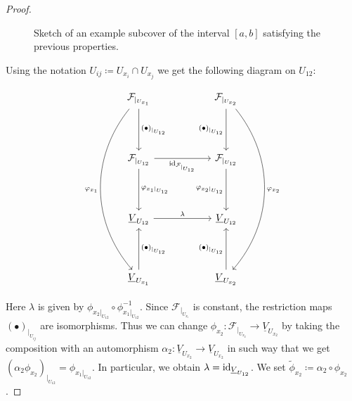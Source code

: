\begin{proof}
\begin{figure}[h!]
    
    \caption{Sketch of an example subcover of the interval $[a,b]$ satisfying the previous properties.}
\end{figure}

     Using the notation $U_{ij} \coloneqq U_{x_i} \cap U_{x_j}$ we get the following diagram on $U_{12}$:

    \[
        \begin{tikzcd}[row sep=1.5cm, column sep=2cm]
         & \mathcal{F}_{\vert_{U_{x_1}}} \arrow[d, "(\bullet)_{\vert_{U_{12}}}"] \arrow[ddd, swap, "\phi_{x_1}", bend right=40] & \mathcal{F}_{\vert_{U_{x_2}}} \arrow[d, swap, "(\bullet)_{\vert_{U_{12}}}"] \arrow[ddd, "\phi_{x_2}", bend left=40] & \\
        & \mathcal{F}_{\vert_{U_{12}}} \arrow[r, swap, "\id_{\mathcal{F}_{\vert_{U_{12}}}}"] \arrow[d, "\phi_{x_1\vert_{U_{12}}}"] &  \mathcal{F}_{\vert_{U_{12}}} \arrow[d, swap, "\phi_{x_2\vert_{U_{12}}}"]& \\
        & \underline{V}_{U_{12}} \arrow[r, "\lambda"] & \underline{V}_{U_{12}} & \\
        & \underline{V}_{U_{x_1}} \arrow[u, swap, "(\bullet)_{\vert_{U_{12}}}"] & \underline{V}_{U_{x_2}} \arrow[u, "(\bullet)_{\vert_{U_{12}}}"] &
        \end{tikzcd}
    \]

Here $\lambda$ is given by $\phi_{x_2\vert_{U_{12}}} \circ \phi_{x_1\vert_{U_{12}}}^{-1}$. Since $\mathcal{F}_{\vert_{U_{x_i}}}$ is constant, the restriction maps $(\bullet)_{\vert_{U_{ij}}}$ are isomorphisms. Thus we can change $\phi_{x_2}: \mathcal{F}_{\vert_{U_{x_2}}} \to \underline{V}_{U_{x_2}}$ by taking the composition with an automorphism $\alpha_2: \underline{V}_{U_{x_2}} \to \underline{V}_{U_{x_2}}$ in such way that we get $(\alpha_2 \phi_{x_2})_{\vert_{U_{12}}} = \phi_{x_1\vert_{U_{12}}}$. In particular, we obtain $\lambda =\operatorname{id}_{\underline{V}_{U_{12}}}$. We set $\tilde{\phi}_{x_2} \coloneqq \alpha_2 \circ \phi_{x_2}$.


\end{proof}
